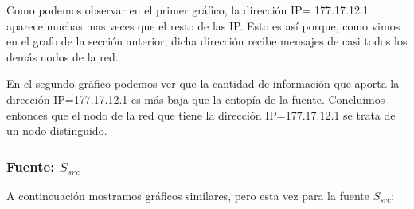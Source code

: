 \documentclass[10pt, a4paper]{article}
\begin{document}
Como podemos observar en el primer gráfico, la dirección IP= 177.17.12.1 aparece muchas mas veces que el resto de las IP. Esto es así porque, como vimos en el grafo de la sección anterior, dicha dirección recibe mensajes de casi todos los demás nodos de la red.

En el segundo gráfico podemos ver que la cantidad de información que aporta la dirección IP=177.17.12.1 es más baja que la entopía de la fuente. Concluimos entonces que el nodo de la red que tiene la dirección IP=177.17.12.1 se trata de un nodo distinguido.
 
 
\subsubsection{Fuente: $S_{src}$}

A contincuación mostramos gráficos similares, pero esta vez para la fuente $S_{src}$:
\end{document}
